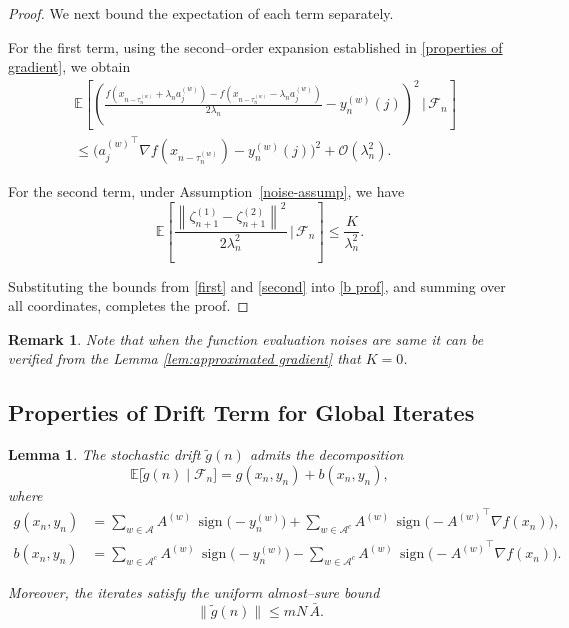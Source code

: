 \documentclass{article}
\newtheorem{lemma}[theorem]{Lemma}
\newtheorem{remark}[theorem]{Remark}
\newcommand{\norm}[1]{\left\lVert #1 \right\rVert}
\DeclareMathOperator*{\sign}{sign}
\begin{document}
\begin{proof}
We next bound the expectation of each term separately.

For the first term, using the second--order expansion established in \eqref{properties of gradient}, we obtain
\begin{equation}
\begin{split}
&\mathbb{E}\!\left[
\left(
\frac{
f\!\left(x_{n-\tau_n^{(w)}} + \lambda_n a_j^{(w)}\right)
- f\!\left(x_{n-\tau_n^{(w)}} - \lambda_n a_j^{(w)}\right)
}{2\lambda_n}
- y_n^{(w)}(j)
\right)^2
\,\Big|\, \mathcal{F}_n
\right] \\
&\leq 
\big({a_j^{(w)}}^\top \nabla f(x_{n-\tau_n^{(w)}}) - y_n^{(w)}(j)\big)^2 
+ \mathcal{O}(\lambda_n^2).
\end{split}
\label{first}
\end{equation}

For the second term, under Assumption~\ref{noise-assump}, we have
\begin{equation}
\mathbb{E}\!\left[
\frac{\norm{\zeta_{n+1}^{(1)} - \zeta_{n+1}^{(2)}}^2}{2\lambda_n^2}
\,\Big|\, \mathcal{F}_n
\right]
\leq \frac{K}{\lambda_n^2}.
\label{second}
\end{equation}

Substituting the bounds from \eqref{first} and \eqref{second} into \eqref{b prof}, and summing over all coordinates, completes the proof.
\end{proof}

\begin{remark}
    Note that when the function evaluation noises are same  it can be verified from the Lemma \ref{lem:approximated gradient} that $K = 0$. 
\end{remark}

\subsection{Properties of Drift Term for Global Iterates}
\begin{lemma}
\label{lem:drift_g}
The stochastic drift $\widetilde g(n)$ admits the decomposition
\[
\mathbb{E}\big[\widetilde g(n)\mid\mathcal{F}_n\big] 
= g(x_n,y_n) + b(x_n,y_n),
\]
where
\[
\begin{aligned}
g(x_n,y_n)
&= \sum_{w \in \mathcal{A}} A^{(w)} \,\sign\!\big(-y_n^{(w)}\big)
+ \sum_{w \in \mathcal{A}^c} A^{(w)} \,\sign\!\big(- {A^{(w)}}^\top \nabla f(x_n)\big), \\[4pt]
b(x_n,y_n)
&= \sum_{w \in \mathcal{A}^c} A^{(w)} \,\sign\!\big(-y_n^{(w)}\big)
- \sum_{w \in \mathcal{A}^c} A^{(w)} \,\sign\!\big(- {A^{(w)}}^\top \nabla f(x_n)\big).
\end{aligned}
\]

Moreover, the iterates satisfy the uniform almost--sure bound
\[
\|\widetilde g(n)\| \le m N\,\bar{A}.
\]
\end{lemma}
\end{document}
